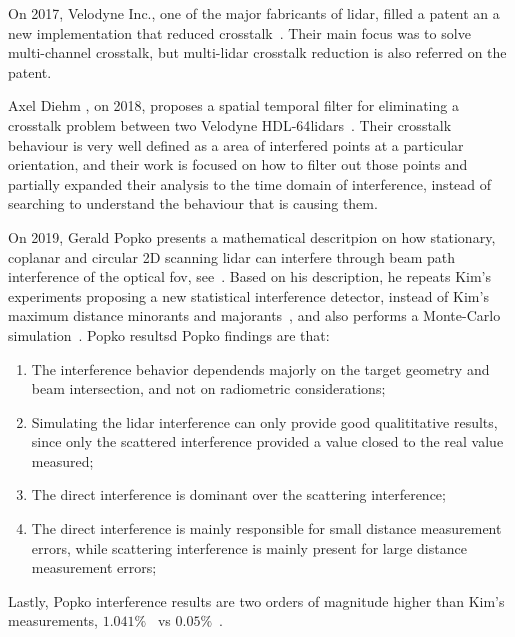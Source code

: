 On 2017, Velodyne Inc., one of the major fabricants of \ac{lidar}, filled a patent an a new implementation that reduced crosstalk~\cite{Hall2017}. Their main focus was to solve multi-channel crosstalk, but multi-\ac{lidar} crosstalk reduction is also referred on the patent.

Axel Diehm \etal, on 2018, proposes a spatial temporal filter for eliminating a crosstalk problem between two Velodyne HDL-64\acp{lidar}~\cite{Hebel2018}. Their crosstalk behaviour is very well defined as a area of interfered points at a particular orientation, and their work is focused on how to filter out those points and partially expanded their analysis to the time domain of interference, instead of searching to understand the behaviour that is causing them.

On 2019, Gerald Popko \etal presents a mathematical descritpion on how stationary, coplanar and circular 2D scanning \ac{lidar} can interfere through beam path interference of the optical \ac{fov}, see~\cite{Popko2019a}. Based on his description, he repeats Kim's \etal experiments proposing a new statistical interference detector, instead of Kim's maximum distance minorants and majorants~\cite{Kim2015a}, and also performs a Monte-Carlo simulation~\cite{Popko2019b}. Popko resultsd Popko \etal findings are that:

\begin{enumerate}
	\item The interference behavior dependends majorly on the target geometry and beam intersection, and not on radiometric considerations;
	\item Simulating the \ac{lidar} interference can only provide good qualititative results, since only the scattered interference provided a value closed to the real value measured;
	\item The direct interference is dominant over the scattering interference;
	\item The direct interference is mainly responsible for small distance measurement errors, while scattering interference is mainly present for large distance measurement errors;
\end{enumerate}

Lastly, Popko \etal interference results are two orders of magnitude higher than Kim's \etal measurements, $1.041 \%$~\cite{Popko2019b} vs $0.05\%$~\cite{Kim2015a}.


